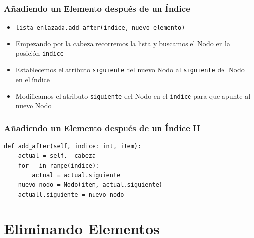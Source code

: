 \documentclass[11pt]{beamer}
\begin{document}
	\begin{frame}
		\frametitle{Añadiendo un Elemento después de un Índice}
		\begin{itemize}
			\item \lstinline|lista_enlazada.add_after(indice, nuevo_elemento)|
			\item Empezando por la cabeza recorremos la lista y buscamos el Nodo en la posición \texttt{indice}
			\item Establecemos el atributo \texttt{siguiente} del nuevo Nodo al \texttt{siguiente} del Nodo en el índice
			\item Modificamos el atributo \texttt{siguiente} del Nodo en el \texttt{indice} para que apunte al nuevo Nodo
		\end{itemize}
		\vspace{0.7cm}
		\begin{center}
		\end{center}
	\end{frame}

	\begin{frame}[fragile]
		\frametitle{Añadiendo un Elemento después de un Índice II}
\begin{lstlisting}
def add_after(self, indice: int, item):
	actual = self.__cabeza
	for _ in range(indice):
		actual = actual.siguiente
	nuevo_nodo = Nodo(item, actual.siguiente)
	actuall.siguiente = nuevo_nodo
\end{lstlisting}
	\end{frame}

\section{Eliminando Elementos}
\end{document}
